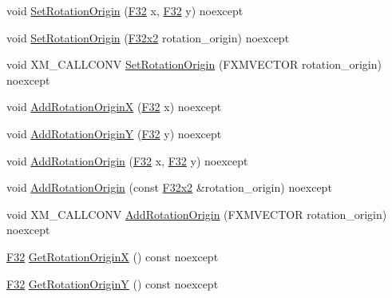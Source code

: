 \begin{DoxyCompactItemize}
void \mbox{\hyperlink{classmage_1_1_texture_transform_a86667569140479a6b7bf6e1987f88c7c}{Set\+Rotation\+Origin}} (\mbox{\hyperlink{namespacemage_aa97e833b45f06d60a0a9c4fc22ae02c0}{F32}} x, \mbox{\hyperlink{namespacemage_aa97e833b45f06d60a0a9c4fc22ae02c0}{F32}} y) noexcept
\item 
void \mbox{\hyperlink{classmage_1_1_texture_transform_a925bdc5bb7405a34a79798a813e55586}{Set\+Rotation\+Origin}} (\mbox{\hyperlink{namespacemage_aee4759dedc8def6c6dec26b5c7eddf29}{F32x2}} rotation\+\_\+origin) noexcept
\item 
void X\+M\+\_\+\+C\+A\+L\+L\+C\+O\+NV \mbox{\hyperlink{classmage_1_1_texture_transform_a41aebcbc263a678157081986a72f52af}{Set\+Rotation\+Origin}} (F\+X\+M\+V\+E\+C\+T\+OR rotation\+\_\+origin) noexcept
\item 
void \mbox{\hyperlink{classmage_1_1_texture_transform_a591aacd1662da3de581d440d921a99df}{Add\+Rotation\+OriginX}} (\mbox{\hyperlink{namespacemage_aa97e833b45f06d60a0a9c4fc22ae02c0}{F32}} x) noexcept
\item 
void \mbox{\hyperlink{classmage_1_1_texture_transform_a5d3dd574b9471f4ae1162819abc394bf}{Add\+Rotation\+OriginY}} (\mbox{\hyperlink{namespacemage_aa97e833b45f06d60a0a9c4fc22ae02c0}{F32}} y) noexcept
\item 
void \mbox{\hyperlink{classmage_1_1_texture_transform_a2ad2af24299e50c43b9f8ac459544f31}{Add\+Rotation\+Origin}} (\mbox{\hyperlink{namespacemage_aa97e833b45f06d60a0a9c4fc22ae02c0}{F32}} x, \mbox{\hyperlink{namespacemage_aa97e833b45f06d60a0a9c4fc22ae02c0}{F32}} y) noexcept
\item 
void \mbox{\hyperlink{classmage_1_1_texture_transform_a1a4009b46ef0cab66dd77bf0dc842142}{Add\+Rotation\+Origin}} (const \mbox{\hyperlink{namespacemage_aee4759dedc8def6c6dec26b5c7eddf29}{F32x2}} \&rotation\+\_\+origin) noexcept
\item 
void X\+M\+\_\+\+C\+A\+L\+L\+C\+O\+NV \mbox{\hyperlink{classmage_1_1_texture_transform_a67e287acb98ea8aeeda4e3466859c8b6}{Add\+Rotation\+Origin}} (F\+X\+M\+V\+E\+C\+T\+OR rotation\+\_\+origin) noexcept
\item 
\mbox{\hyperlink{namespacemage_aa97e833b45f06d60a0a9c4fc22ae02c0}{F32}} \mbox{\hyperlink{classmage_1_1_texture_transform_a8cf3f245042d98a135b5d12ae590b2b2}{Get\+Rotation\+OriginX}} () const noexcept
\item 
\mbox{\hyperlink{namespacemage_aa97e833b45f06d60a0a9c4fc22ae02c0}{F32}} \mbox{\hyperlink{classmage_1_1_texture_transform_a2efe9088ae3532b188bab7c5b27238e6}{Get\+Rotation\+OriginY}} () const noexcept

\end{DoxyCompactItemize}
